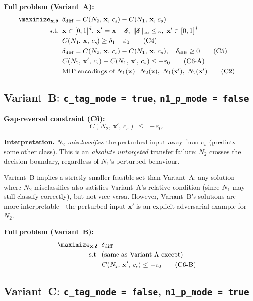\documentclass[11pt,a4paper]{article}
\theoremstyle{definition}
\theoremstyle{plain}
\newcommand{\Conf}[3]{C(#1,\,#2,\,#3)}
\newcommand{\NN}[1]{N_{#1}}
\newcommand{\vx}{\mathbf{x}}
\newcommand{\ve}{\boldsymbol{\delta}}
\newcommand{\vxp}{\mathbf{x}'}
\newcommand{\eps}{\varepsilon}
\newcommand{\epszero}{\varepsilon_0}
\newcommand{\deltadiff}{\delta_{\mathrm{diff}}}
\newcommand{\deltaone}{\delta_1}
\begin{document}
\medskip
\noindent\textbf{Full problem (Variant~A):}
\begin{align*}
  \maximize_{\vx,\ve}\;\; & \deltadiff = \Conf{\NN{2}}{\vx}{c_s} - \Conf{\NN{1}}{\vx}{c_s} \\
  \mathrm{s.t.}\;\;
    & \vx \in [0,1]^d,\; \vxp = \vx+\ve,\; \|\ve\|_\infty \le \eps,\; \vxp \in [0,1]^d \\
    & \Conf{\NN{1}}{\vx}{c_s} \ge \deltaone + \epszero \tag{C4} \\
    & \deltadiff = \Conf{\NN{2}}{\vx}{c_s} - \Conf{\NN{1}}{\vx}{c_s},\quad \deltadiff \ge 0 \tag{C5} \\
    & \Conf{\NN{2}}{\vxp}{c_s} - \Conf{\NN{1}}{\vxp}{c_s} \le -\epszero \tag{C6-A} \\
    & \text{MIP encodings of } \NN{1}(\vx),\;\NN{2}(\vx),\;\NN{1}(\vxp),\;\NN{2}(\vxp) \tag{C2}
\end{align*}

\subsection{Variant~B: \texttt{c\_tag\_mode = true}, \texttt{n1\_p\_mode = false}}

\textbf{Gap-reversal constraint (C6):}
\[
  \Conf{\NN{2}}{\vxp}{c_s} \;\le\; -\epszero.
\]

\textbf{Interpretation.}
$\NN{2}$ \emph{misclassifies} the perturbed input away from $c_s$ (predicts some other class). This is an \emph{absolute untargeted} transfer failure: $\NN{2}$ crosses the decision boundary, regardless of $\NN{1}$'s perturbed behaviour.

Variant~B implies a strictly smaller feasible set than Variant~A: any solution where $\NN{2}$ misclassifies also satisfies Variant~A's relative condition (since $\NN{1}$ may still classify correctly), but not vice versa. However, Variant~B's solutions are more interpretable---the perturbed input $\vxp$ is an explicit adversarial example for $\NN{2}$.

\medskip
\noindent\textbf{Full problem (Variant~B):}
\begin{align*}
  \maximize_{\vx,\ve}\;\; & \deltadiff \\
  \mathrm{s.t.}\;\;
    & \text{(same as Variant~A except)} \\
    & \Conf{\NN{2}}{\vxp}{c_s} \le -\epszero \tag{C6-B}
\end{align*}

\subsection{Variant~C: \texttt{c\_tag\_mode = false}, \texttt{n1\_p\_mode = true}}
\end{document}
